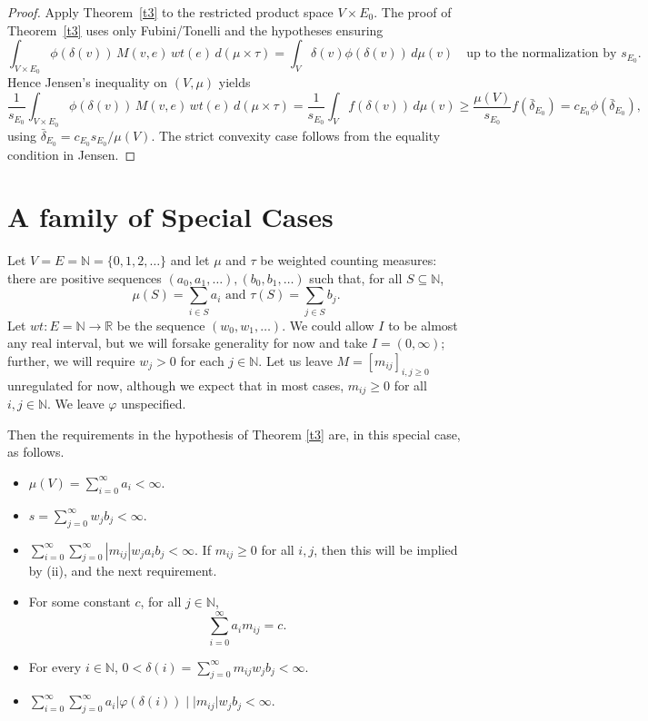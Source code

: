 \documentclass[final,1p,times]{elsarticle}
\begin{document}
\begin{proof}
Apply Theorem~\ref{t3} to the restricted product space \(V\times E_0\).
The proof of Theorem~\ref{t3} uses only Fubini/Tonelli and the hypotheses ensuring
\[
\int_{V\times E_0}\phi(\delta(v))\,M(v,e)\,wt(e)\,d(\mu\times\tau)
=
\int_V \delta(v)\phi(\delta(v))\,d\mu(v)
\quad\text{up to the normalization by }s_{E_0}.
\]
Hence Jensen's inequality on \((V,\mu)\) yields
\[
\frac{1}{s_{E_0}}\int_{V\times E_0}\phi(\delta(v))\,M(v,e)\,wt(e)\,d(\mu\times\tau)
=
\frac{1}{s_{E_0}}\int_V f(\delta(v))\,d\mu(v)
\ge
\frac{\mu(V)}{s_{E_0}} f(\bar\delta_{E_0})
=
c_{E_0}\phi(\bar\delta_{E_0}),
\]
using \(\bar\delta_{E_0}=c_{E_0}s_{E_0}/\mu(V)\). The strict convexity case follows from the equality condition in Jensen.
\end{proof}


\section{A family of Special Cases}

Let $V = E = \mathbb {N} = \{0, 1, 2, \dots \}$ and let $\mu$ and $\tau$ be weighted counting measures: there are positive sequences $(a_0, a_1, \dots), (b_0, b_1, \dots)$ such that, for all $S \subseteq \mathbb {N}$,
$$
\mu (S) = \sum _{i \in S} a_i \mbox { and } \tau (S) = \sum _{j \in S} b_j.
$$
Let $wt: E = \mathbb {N} \to \mathbb {R}$ be the sequence $(w_0, w_1, \dots)$.  We could allow $I$ to be almost any real interval, but we will forsake generality for now and take $I = (0, \infty)$; further, we will require $w_j > 0$ for each $j \in \mathbb {N}$.  Let us leave $M = [m_{ij}]_{i, j \geq 0}$ unregulated for now, although we expect that in most cases, $m_{ij} \geq 0$ for all $i, j \in \mathbb {N}$.  We leave $\varphi$ unspecified.

Then the requirements in the hypothesis of Theorem \ref {t3} are, in this special case, as follows.

\begin{itemize}
\item [(i)] $\mu (V) = \sum ^{\infty}_{i=0} a_i < \infty$.
\item [(ii)] $s = \sum _{j=0}^{\infty} w_j b_j < \infty$.     
\item [(iii)] $\sum _{i=0}^{\infty} \sum _{j=0}^{\infty} |m_{ij}| w_j a_i b_j < \infty$.
If $m_{ij} \geq 0$ for all $i, j$, then this will be implied by 
(ii), and the next requirement.
\item [(iv)] For some constant $c$, for all $j \in \mathbb {N}$,
$$
\sum _{i=0}^{\infty} a_i m_{ij} = c.
$$

\item [(v)] For every $i \in \mathbb {N}$, $0 < \delta (i) = \sum _{j=0}^{\infty} m_{ij} w_j b_j < \infty$.
\item [(vi)] $\sum _{i=0}^{\infty} \sum _{j=0}^{\infty} a_i| \varphi (\delta (i)) \mid |m_{ij}| w_j b_j < \infty$.
\end{itemize}
\end{document}
